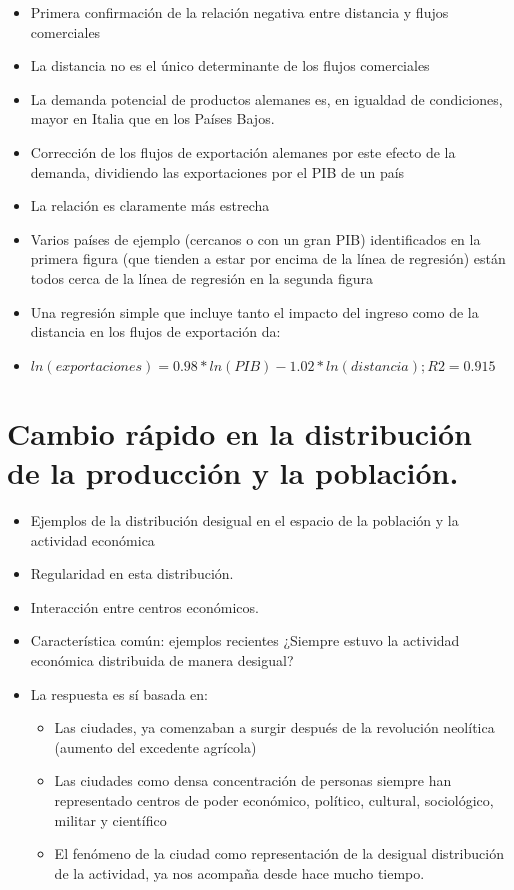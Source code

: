 \begin{itemize}
    \item Primera confirmación de la relación negativa entre distancia y flujos comerciales
    \item La distancia no es el único determinante de los flujos comerciales
    \item La demanda potencial de productos alemanes es, en igualdad de condiciones, mayor en Italia que en los Países Bajos.
    \item Corrección de los flujos de exportación alemanes por este efecto de la demanda, dividiendo las exportaciones por el PIB de un país
    \item La relación es claramente más estrecha
    \item Varios países de ejemplo (cercanos o con un gran PIB) identificados en la primera figura (que tienden a estar por encima de la línea de regresión) están todos cerca de la línea de regresión en la segunda figura
    \item Una regresión simple que incluye tanto el impacto del ingreso como de la distancia en los flujos de exportación da:
    \item $ln(exportaciones) = 0.98*ln(PIB) - 1.02*ln(distancia); R2=0.915$
\end{itemize}

\section{Cambio rápido en la distribución de la producción y la población.}
\begin{itemize}
    \item Ejemplos de la distribución desigual en el espacio de la población y la actividad económica
    \item Regularidad en esta distribución.
    \item Interacción entre centros económicos.
    \item Característica común: ejemplos recientes ¿Siempre estuvo la actividad económica distribuida de manera desigual?
    \item La respuesta es sí basada en:
	\begin{itemize}
	    \item Las ciudades, ya comenzaban a surgir después de la revolución neolítica (aumento del excedente agrícola) 
	    \item Las ciudades como densa concentración de personas siempre han representado centros de poder económico, político, cultural, sociológico, militar y científico 
	    \item El fenómeno de la ciudad como representación de la desigual distribución de la actividad, ya nos acompaña desde hace mucho tiempo.
	\end{itemize}
\end{itemize}

